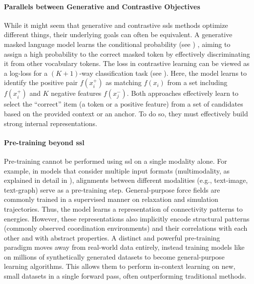 \paragraph{Parallels between Generative and Contrastive Objectives}

While it might seem that generative and contrastive \glspl{ssl} methods optimize different things, their underlying goals can often be equivalent. 
A generative masked language model learns the conditional probability
(see )
, aiming to assign a high probability to the correct masked token by effectively discriminating it from other vocabulary tokens. 
The  loss in contrastive learning can be viewed as a log-loss for a $(K+1)$-way classification task (see ). 
Here, the model learns to identify the positive pair $f(x_i^+)$ as matching $f(x_i)$ from a set including $f(x_i^+)$ and $K$ negative features $f(x_j^-)$. 
Both approaches effectively learn to select the \enquote{correct} item (a token or a positive feature) from a set of candidates based on the provided context or an anchor. 
To do so, they must effectively build strong internal representations.




\paragraph{Pre-training beyond \gls{ssl}}
Pre-training cannot be performed using \gls{ssl} on a single modality alone.  For example, in models that consider multiple input formats (multimodality, as explained in detail in ), alignments between different modalities (e.g., text-image, text-graph) serve as a pre-training step.\autocite{weng2022vlm,girdhar2023imagebind0}  General-purpose force fields are commonly trained in a supervised manner on relaxation and simulation trajectories.\autocite{batatia2022mace, wood2025uma0}
Thus, the model learns a representation of connectivity patterns to energies. However, these representations also implicitly encode structural patterns (commonly observed coordination environments) and their correlations with each other and with abstract properties. 
A distinct and powerful pre-training paradigm moves away from real-world data entirely, instead training models like  on millions of synthetically generated datasets to become general-purpose learning algorithms. This allows them to perform in-context learning on new, small datasets in a single forward pass, often outperforming traditional methods. \autocite{hollmann2025accurate} \\

